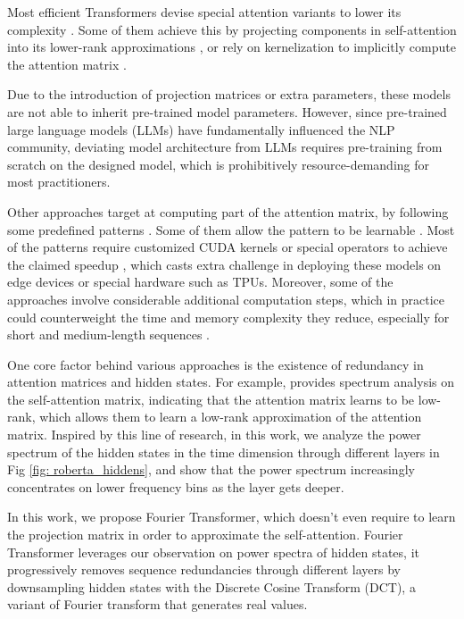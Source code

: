 \documentclass[11pt]{article}
\begin{document}
Most efficient Transformers devise special attention variants to lower its complexity \citep{tay2020efficient}. Some of them achieve this by projecting components in self-attention into its lower-rank approximations \citep[\emph{inter alia}]{wang2020linformer, zhu2021long, winata2020lightweight}, or rely on kernelization to implicitly compute the attention matrix \citep[\emph{inter alia}]{katharopoulos2020transformers, choromanski2020rethinking, peng2021random, choromanski2020masked}.

Due to the introduction of projection matrices or extra parameters, these models are not able to inherit pre-trained model parameters. However, since pre-trained large language models (LLMs) have fundamentally influenced the NLP community, deviating model architecture from LLMs requires pre-training from scratch on the designed model, which is prohibitively resource-demanding for most practitioners. 

Other approaches target at computing part of the attention matrix, by following some predefined patterns \citep[\emph{inter alia}]{child2019generating, qiu2020blockwise, ho2019axial}. Some of them allow the pattern to be learnable \citep[\emph{inter alia}]{sukhbaatar2019adaptive, roy2021efficient}. Most of the patterns require customized CUDA kernels or special operators to achieve the claimed speedup \citep{wu2019pay, child2019generating, beltagy2020longformer}, which casts extra challenge in deploying these models on edge devices or special hardware such as TPUs. Moreover, some of the approaches involve considerable additional computation steps, which in practice could counterweight the time and memory complexity they reduce, especially for short and medium-length sequences \citep{kitaev2020reformer, roy2021efficient}. 

One core factor behind various approaches is the existence of redundancy in attention matrices and hidden states. For example, \citet{wang2020linformer} provides spectrum analysis on the self-attention matrix, indicating that the attention matrix learns to be low-rank, which allows them to learn a low-rank approximation of the attention matrix. Inspired by this line of research, in this work, we analyze the power spectrum of the hidden states in the time dimension through different layers in Fig \ref{fig: roberta_hiddens}, and show that the power spectrum increasingly concentrates on lower frequency bins as the layer gets deeper. 

In this work, we propose Fourier Transformer, which doesn't even require to learn the projection matrix in order to approximate the self-attention. Fourier Transformer leverages our observation on power spectra of hidden states, it progressively removes sequence redundancies through different layers by downsampling hidden states with the Discrete Cosine Transform (DCT), a variant of Fourier transform that generates real values. 
\end{document}
